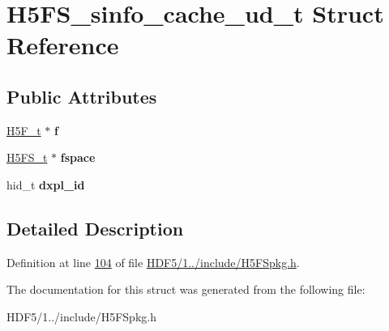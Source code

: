 \hypertarget{struct_h5_f_s__sinfo__cache__ud__t}{}\section{H5\+F\+S\+\_\+sinfo\+\_\+cache\+\_\+ud\+\_\+t Struct Reference}
\label{struct_h5_f_s__sinfo__cache__ud__t}
\subsection*{Public Attributes}
\begin{DoxyCompactItemize}
\item 
\mbox{\label{struct_h5_f_s__sinfo__cache__ud__t_af1d4a6a5c9b3f824bf6d47b776240b6e}} 
\hyperlink{struct_h5_f__t}{H5\+F\+\_\+t} $\ast$ {\bfseries f}
\item 
\mbox{\label{struct_h5_f_s__sinfo__cache__ud__t_aeded23bf2a684da3aa89b4e8ff6e35fb}} 
\hyperlink{struct_h5_f_s__t}{H5\+F\+S\+\_\+t} $\ast$ {\bfseries fspace}
\item 
\mbox{\label{struct_h5_f_s__sinfo__cache__ud__t_af019296c792aee10fd2fcdd3920406ec}} 
hid\+\_\+t {\bfseries dxpl\+\_\+id}
\end{DoxyCompactItemize}


\subsection{Detailed Description}


Definition at line \hyperlink{_h_d_f5_21_810_81_2include_2_h5_f_spkg_8h_source_l00104}{104} of file \hyperlink{_h_d_f5_21_810_81_2include_2_h5_f_spkg_8h_source}{H\+D\+F5/1../include/\+H5\+F\+Spkg.\+h}.



The documentation for this struct was generated from the following file\+:\begin{DoxyCompactItemize}
\item 
H\+D\+F5/1../include/\+H5\+F\+Spkg.\+h\end{DoxyCompactItemize}
